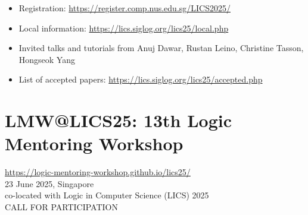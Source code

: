 \documentclass[prodmode,acmtecs]{acmsmall} %
\begin{document}
\begin{itemize}\item  Registration: \href{https://register.comp.nus.edu.sg/LICS2025/}{https://register.comp.nus.edu.sg/LICS2025/} 
 
\item  Local information: \href{https://lics.siglog.org/lics25/local.php}{https://lics.siglog.org/lics25/local.php} 
 
\item  Invited talks and tutorials from Anuj Dawar, Rustan Leino, Christine Tasson, Hongseok Yang 
 
\item  List of accepted papers: \href{https://lics.siglog.org/lics25/accepted.php}{https://lics.siglog.org/lics25/accepted.php} 
 
\end{itemize}\section{LMW@LICS25: 13th Logic Mentoring Workshop}\label{LMWLICS25}  \href{https://logic-mentoring-workshop.github.io/lics25/}{https://logic-mentoring-workshop.github.io/lics25/}\\ 
  23 June 2025, Singapore\\ 
  co-located with Logic in Computer Science (LICS) 2025\\ 
CALL FOR PARTICIPATION 
\end{document}
